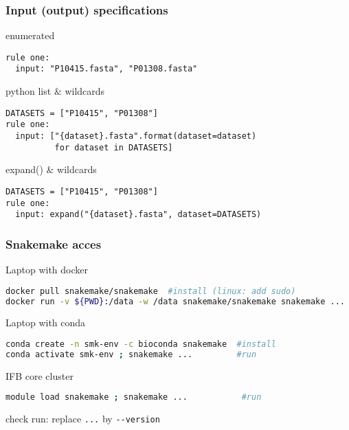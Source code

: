 \begin{frame}[containsverbatim]
\frametitle{Input (output) specifications}
\begin{block}{enumerated}
\begin{lstlisting}
rule one:
  input: "P10415.fasta", "P01308.fasta"
\end{lstlisting}
\end{block}
\begin{block}{python list $\&$ wildcards}
\begin{lstlisting}
DATASETS = ["P10415", "P01308"]
rule one: 
  input: ["{dataset}.fasta".format(dataset=dataset) 
          for dataset in DATASETS] 
\end{lstlisting}
\end{block}
\begin{block}{expand() $\&$ wildcards}
\begin{lstlisting}
DATASETS = ["P10415", "P01308"]
rule one: 
  input: expand("{dataset}.fasta", dataset=DATASETS) 
\end{lstlisting}
\end{block}
\end{frame}
\begin{frame}[containsverbatim]
\frametitle{Snakemake acces}
\begin{block}{Laptop with docker}
\begin{lstlisting}[language=bash]
docker pull snakemake/snakemake  #install (linux: add sudo)
docker run -v ${PWD}:/data -w /data snakemake/snakemake snakemake ...  #run
\end{lstlisting}
\end{block}
\begin{block}{Laptop with conda}
\begin{lstlisting}[language=bash]
conda create -n smk-env -c bioconda snakemake  #install
conda activate smk-env ; snakemake ...         #run
\end{lstlisting}
\end{block}
\begin{block}{IFB core cluster}
\begin{lstlisting}[language=bash]
module load snakemake ; snakemake ...           #run
\end{lstlisting}
\end{block}
check run: replace \verb|...| by \verb|--version|
\end{frame}